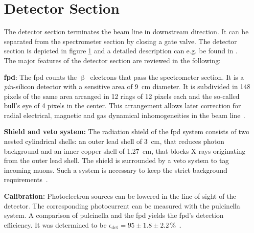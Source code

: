 \section{Detector Section}
\label{sec:katrinExpSetupDetector}
\begin{figure}[t]
 \label{fig:katrinExpSetupDetector}
\end{figure}

The detector section terminates the beam line in downstream direction. It can be separated from the spectrometer section by closing a gate valve. The detector section is depicted in figure \ref{fig:katrinExpSetupDetector} and a detailed description can e.g. be found in \cite{Amsbaugh2015}. The major features of the detector section are reviewed in the following:

{\par \textbf{\Gls{fpd}}: The \gls{fpd} counts the $\upbeta$~electrons that pass the spectrometer section. It is a \textit{pin}-silicon detector with a sensitive area of \SI{9}{cm} diameter. It is subdivided in 148 pixels of the same area arranged in 12 rings of 12 pixels each and the so-called bull's eye of 4 pixels in the center. This arrangement allows later correction for radial electrical, magnetic and gas dynamical inhomogeneities in the beam line~\cite{Amsbaugh2015}.}

{\par \textbf{Shield and veto system:} The radiation shield of the \gls{fpd} system consists of two nested cylindrical shells: an outer lead shell of \SI{3}{cm}, that reduces photon background and an inner copper shell of \SI{1.27}{cm}, that blocks X-rays originating from the outer lead shell. The shield is surrounded by a veto system to tag incoming muons. Such a system is necessary to keep the strict background requirements~\cite{Amsbaugh2015}.}

{\par \textbf{Calibration:} Photoelectron sources can be lowered in the line of sight of the detector. The corresponding photocurrent can be measured with the \gls{pulcinella} system. A comparison of \gls{pulcinella} and the \gls{fpd} yields the \gls{fpd}'s detection efficiency. It was determined to be $\epsilon_\mathrm{det}=95\pm1.8\pm2.2\,\text{\%}$~\cite{Amsbaugh2015}.}

